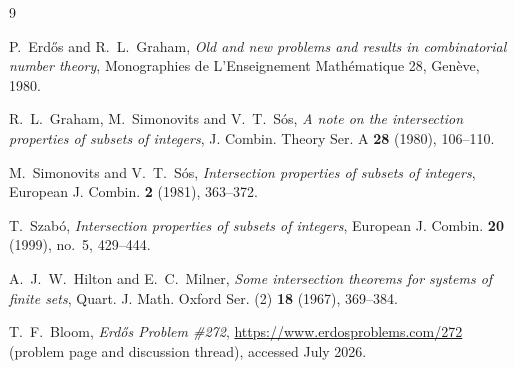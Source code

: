 \documentclass[11pt]{article}
\theoremstyle{definition}
\begin{document}
\begin{thebibliography}{9}

 P.~Erd\H{o}s and R.~L.~Graham, \emph{Old and new problems and results in combinatorial number theory}, Monographies de L'Enseignement Math\'ematique 28, Gen\`eve, 1980.

 R.~L.~Graham, M.~Simonovits and V.~T.~S\'os, \emph{A note on the intersection properties of subsets of integers}, J. Combin. Theory Ser. A \textbf{28} (1980), 106--110.

 M.~Simonovits and V.~T.~S\'os, \emph{Intersection properties of subsets of integers}, European J. Combin. \textbf{2} (1981), 363--372.

 T.~Szab\'o, \emph{Intersection properties of subsets of integers}, European J. Combin. \textbf{20} (1999), no.~5, 429--444.

 A.~J.~W.~Hilton and E.~C.~Milner, \emph{Some intersection theorems for systems of finite sets}, Quart. J. Math. Oxford Ser. (2) \textbf{18} (1967), 369--384.

 T.~F.~Bloom, \emph{Erd\H{o}s Problem \#272}, \url{https://www.erdosproblems.com/272} (problem page and discussion thread), accessed July 2026.

\end{thebibliography}
\end{document}
